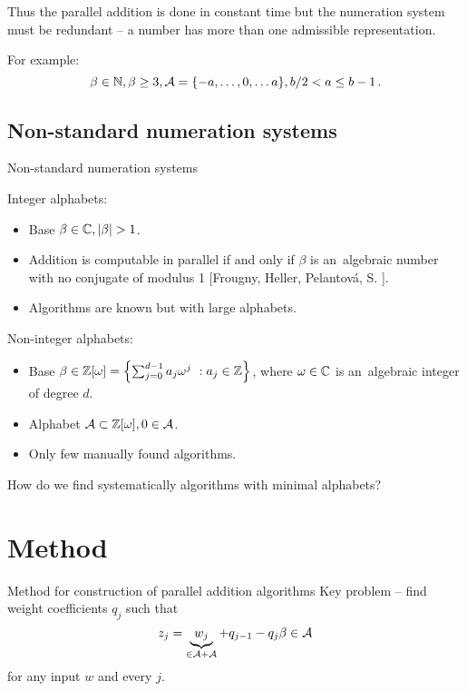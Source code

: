   Thus the parallel addition is done in constant time but the numeration system must be redundant -- a number has more than one admissible representation.
  
  
  For example:
  $$
  \beta \in \mathbb{N}, \beta \geq 3, \mathcal{A}=\{-a, \dots, 0, \dots a\}, b/2 <a \leq b-1\,. 
  $$
    


\subsection{Non-standard numeration systems}

    {Non-standard numeration systems}
    
    Integer alphabets:
    \begin{itemize}
        \item Base $\beta \in \CC, |\beta|>1$.
        
        \item Addition is computable in parallel if and only if $\beta$ is an~algebraic number with no conjugate of modulus 1 [Frougny, Heller, Pelantov\'a, S. ].
        
        \item Algorithms are known but with large alphabets.
    \end{itemize}
    
    
    Non-integer alphabets:
    \begin{itemize}
        \item Base $\beta \in \mathbb{Z}[\omega]= \left\{\sum_{j=0}^{d-1} a_j \omega^j\ : a_j \in \mathbb{Z} \right\}$, where $\omega \in \mathbb{C}$ is an~algebraic integer of degree $d$.
        
        \item Alphabet $\mathcal{A} \subset \mathbb{Z}[\omega] , 0\in \mathcal{A}$.
        
        \item Only few manually found algorithms. 
    \end{itemize}
    
    
    
    How do we find systematically algorithms with minimal alphabets?  



\section{Method}

    {Method for construction of parallel addition algorithms}
    Key problem -- find weight coefficients $q_j$ such that 
    $$
        z_j=\underbrace{w_j}_{\in \mathcal{A} +\mathcal{A}} + q_{j-1} - q_j \beta \in \mathcal{A} 
    $$  
    for any input $w$ and every $j$.
    
